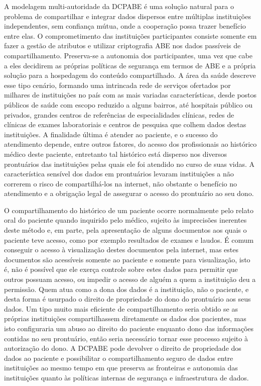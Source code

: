 \documentclass[a4paper,11pt]{article}
\begin{document}
A modelagem multi-autoridade da DCPABE é uma solução natural para o problema de compartilhar e integrar dados dispersos entre múltiplas instituições independentes, sem confiança mútua, onde a cooperação possa trazer benefício entre elas.
O comprometimento das instituições participantes consiste somente em fazer a gestão de atributos e utilizar criptografia ABE nos dados passíveis de compartilhamento.
Preserva-se a autonomia dos participantes, uma vez que cabe a eles decidirem as próprias políticas de segurança em termos de ABE e a própria solução para a hospedagem do conteúdo compartilhado. %
A área da saúde descreve esse tipo cenário, formando uma intrincada rede de serviços ofertados por milhares de instituições no país com as mais variadas características, desde postos públicos de saúde com escopo reduzido a alguns bairros, até hospitais público ou privados, grandes centros de referências de especialidades clínicas, redes de clínicas de exames laboratoriais e centros de pesquisa que colhem dados destas instituições.
A finalidade última é atender ao paciente, e o sucesso do atendimento depende, entre outros fatores, do acesso dos profissionais ao histórico médico deste paciente, entretanto tal histórico está disperso nos diversos prontuários das instituições pelas quais ele foi atendido no curso de suas vidas.
A característica sensível dos dados em prontuários levaram instituições a não correrem o risco de compartilhá-los na internet, não obstante o benefício no atendimento e a obrigação legal de assegurar o acesso do prontuário ao seu dono.

O compartilhamento do histórico de um paciente ocorre normalmente pelo relato oral do paciente quando inquirido pelo médico, sujeito às imprecisões inerentes deste método e, em parte, pela apresentação de alguns documentos aos quais o paciente teve acesso, como por exemplo resultados de exames e laudos.
É comum conseguir o acesso à visualização destes documentos pela internet, mas estes documentos são acessíveis somente ao paciente e somente para visualização, isto é, não é possível que ele exerça controle sobre estes dados para permitir que outros possuam acesso, ou impedir o acesso de alguém a quem a instituição deu a permissão.
Quem atua como a dona dos dados é a instituição, não o paciente, e desta forma é usurpado o direito de propriedade do dono do prontuário aos seus dados.
Um tipo muito mais eficiente de compartilhamento seria obtido se as próprias instituições compartilhassem diretamente os dados dos pacientes, mas isto configuraria um abuso ao direito do paciente enquanto dono das informações contidas no seu prontuário, então seria necessário tornar esse processo sujeito à autorização do dono.
A DCPABE pode devolver o direito de propriedade dos dados ao paciente e possibilitar o compartilhamento seguro de dados entre instituições ao mesmo tempo em que preserva as fronteiras e autonomia das instituições quanto às políticas internas de segurança e infraestrutura de dados.
\end{document}
